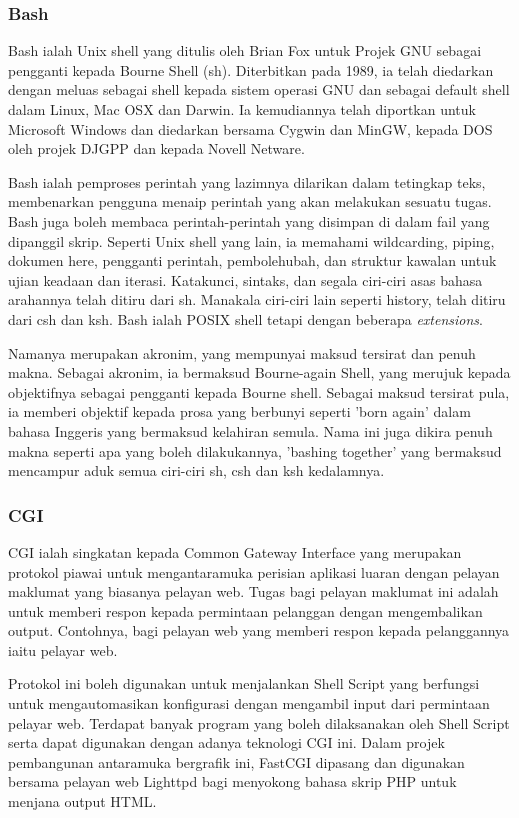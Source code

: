 \subsubsection{Bash}
Bash ialah Unix shell yang ditulis oleh Brian Fox untuk Projek GNU sebagai pengganti kepada Bourne Shell (sh). Diterbitkan pada 1989, ia telah diedarkan dengan meluas sebagai shell kepada sistem operasi GNU dan sebagai default shell dalam Linux, Mac OSX dan Darwin. Ia kemudiannya telah diportkan untuk Microsoft Windows dan diedarkan bersama Cygwin dan MinGW, kepada DOS oleh projek DJGPP dan kepada Novell Netware.

Bash ialah pemproses perintah yang lazimnya dilarikan dalam tetingkap teks, membenarkan pengguna menaip perintah yang akan melakukan sesuatu tugas. Bash juga boleh membaca perintah-perintah yang disimpan di dalam fail yang dipanggil skrip. Seperti Unix shell yang lain, ia memahami wildcarding, piping, dokumen here, pengganti perintah, pembolehubah, dan struktur kawalan untuk ujian keadaan dan iterasi. Katakunci, sintaks, dan segala ciri-ciri asas bahasa arahannya telah ditiru dari sh. Manakala ciri-ciri lain seperti history, telah ditiru dari csh dan ksh. Bash ialah POSIX shell tetapi dengan beberapa \textit{extensions}.

Namanya merupakan akronim, yang mempunyai maksud tersirat dan penuh makna. Sebagai akronim, ia bermaksud Bourne-again Shell, yang merujuk kepada objektifnya sebagai pengganti kepada Bourne shell. Sebagai maksud tersirat pula, ia memberi objektif kepada prosa yang berbunyi seperti 'born again' dalam bahasa Inggeris yang bermaksud kelahiran semula. Nama ini juga dikira penuh makna seperti apa yang boleh dilakukannya, 'bashing together' yang bermaksud mencampur aduk semua ciri-ciri sh, csh dan ksh kedalamnya. 

\subsubsection{CGI}
CGI ialah singkatan kepada Common Gateway Interface yang merupakan protokol piawai untuk mengantaramuka perisian aplikasi luaran dengan pelayan maklumat yang biasanya pelayan web. Tugas bagi pelayan maklumat ini adalah untuk memberi respon kepada permintaan pelanggan dengan mengembalikan output. Contohnya, bagi pelayan web yang memberi respon kepada pelanggannya iaitu pelayar web.

Protokol ini boleh digunakan untuk menjalankan Shell Script yang berfungsi untuk mengautomasikan konfigurasi dengan mengambil input dari permintaan pelayar web. Terdapat banyak program yang boleh dilaksanakan oleh Shell Script serta dapat digunakan dengan adanya teknologi CGI ini. Dalam projek pembangunan antaramuka bergrafik ini, FastCGI dipasang dan digunakan bersama pelayan web Lighttpd bagi menyokong bahasa skrip PHP untuk menjana output HTML.

